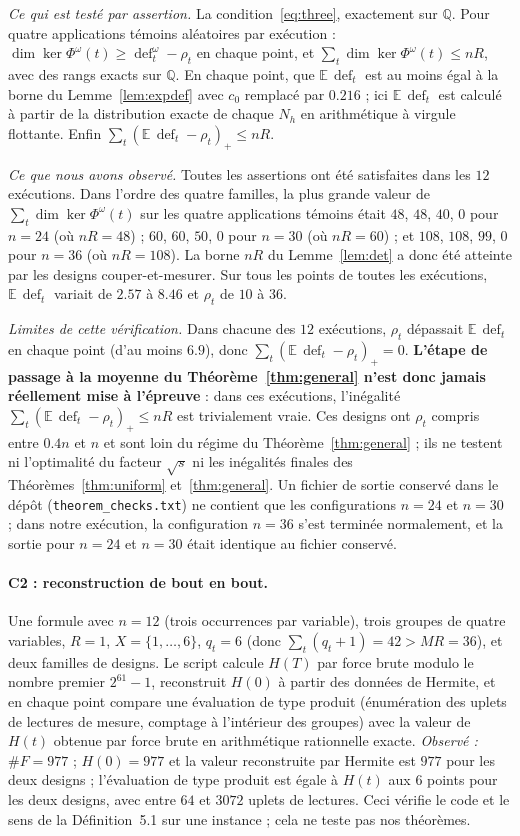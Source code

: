\documentclass[11pt,a4paper]{article}
\theoremstyle{definition}
\theoremstyle{remark}
\newcommand{\Q}{\mathbb{Q}}
\newcommand{\E}{\mathbb{E}}
\newcommand{\dfc}{\operatorname{def}}
\begin{document}
\emph{Ce qui est testé par assertion.} La condition~\eqref{eq:three}, exactement sur $\Q$.
Pour quatre applications témoins aléatoires par exécution :
$\dim\ker\Phi^\omega(t)\ge\dfc^\omega_t-\rho_t$ en chaque point, et
$\sum_t\dim\ker\Phi^\omega(t)\le nR$, avec des rangs exacts sur $\Q$. En chaque point, que
$\E\,\dfc_t$ est au moins égal à la borne du Lemme~\ref{lem:expdef} avec $c_0$ remplacé par
$0.216$ ; ici $\E\,\dfc_t$ est calculé à partir de la distribution exacte de chaque $N_h$ en
arithmétique à virgule flottante. Enfin $\sum_t(\E\,\dfc_t-\rho_t)_+\le nR$.

\emph{Ce que nous avons observé.} Toutes les assertions ont été satisfaites dans les $12$
exécutions. Dans l'ordre des quatre familles, la plus grande valeur de
$\sum_t\dim\ker\Phi^\omega(t)$ sur les quatre applications témoins était $48$, $48$, $40$,
$0$ pour $n=24$ (où $nR=48$) ; $60$, $60$, $50$, $0$ pour $n=30$ (où $nR=60$) ; et $108$,
$108$, $99$, $0$ pour $n=36$ (où $nR=108$). La borne $nR$ du Lemme~\ref{lem:det} a donc été
atteinte par les designs couper-et-mesurer. Sur tous les points de toutes les exécutions,
$\E\,\dfc_t$ variait de $2.57$ à $8.46$ et $\rho_t$ de $10$ à $36$.

\emph{Limites de cette vérification.} Dans chacune des $12$ exécutions, $\rho_t$ dépassait
$\E\,\dfc_t$ en chaque point (d'au moins $6.9$), donc $\sum_t(\E\,\dfc_t-\rho_t)_+=0$.
\textbf{L'étape de passage à la moyenne du Théorème~\ref{thm:general} n'est donc jamais
réellement mise à l'épreuve} : dans ces exécutions, l'inégalité
$\sum_t(\E\,\dfc_t-\rho_t)_+\le nR$ est trivialement vraie. Ces designs ont $\rho_t$ compris entre $0.4n$ et $n$
et sont loin du régime du Théorème~\ref{thm:general} ; ils ne testent ni l'optimalité du
facteur $\sqrt s$ ni les inégalités finales des Théorèmes~\ref{thm:uniform}
et~\ref{thm:general}. Un fichier de sortie conservé dans le dépôt
(\texttt{theorem\_checks.txt}) ne contient que les configurations $n=24$ et $n=30$ ; dans
notre exécution, la configuration $n=36$ s'est terminée normalement, et la sortie pour
$n=24$ et $n=30$ était identique au fichier conservé.

\paragraph{C2 : reconstruction de bout en bout.} Une formule avec $n=12$ (trois occurrences
par variable), trois groupes de quatre variables, $R=1$, $X=\{1,\dots,6\}$, $q_t=6$ (donc
$\sum_t(q_t+1)=42>MR=36$), et deux familles de designs. Le script calcule $H(T)$ par force
brute modulo le nombre premier $2^{61}-1$, reconstruit $H(0)$ à partir des données de
Hermite, et en chaque point compare une évaluation de type produit (énumération des uplets
de lectures de mesure, comptage à l'intérieur des groupes) avec la valeur de $H(t)$ obtenue
par force brute en arithmétique rationnelle exacte.
\emph{Observé :} $\#F=977$ ; $H(0)=977$ et la valeur reconstruite par Hermite est $977$ pour
les deux designs ; l'évaluation de type produit est égale à $H(t)$ aux $6$ points pour les
deux designs, avec entre $64$ et $3072$ uplets de lectures. Ceci vérifie le code et le sens
de la Définition~5.1 sur une instance ; cela ne teste pas nos théorèmes.
\end{document}
